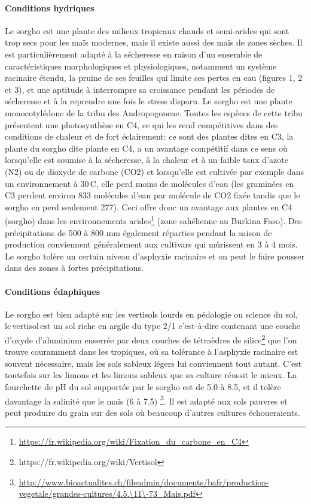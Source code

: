 \documentclass[a4paper,11pt]{article}
\begin{document}
\paragraph{Conditions hydriques} Le sorgho est une plante des milieux
tropicaux chauds et semi-arides qui sont trop secs pour les maïs
modernes, mais il existe aussi des maïs de zones sèches. Il est
particulièrement adapté à la sécheresse en raison d’un ensemble de
caractéristiques morphologiques et physiologiques, notamment un
système racinaire étendu, la pruine de ses feuilles qui limite ses
pertes en eau (figures 1, 2 et 3), et une aptitude à interrompre sa
croissance pendant les périodes de sécheresse et à la reprendre une
fois le stress disparu. Le sorgho est une plante monocotylédone de la
tribu des Andropogoneae. Toutes les espèces de cette tribu présentent
une photosynthèse en C4, ce qui les rend compétitives dans des
conditions de chaleur et de fort éclairement: ce sont des plantes
dites en C3, la plante du sorgho dite plante en C4, a un avantage
compétitif dans ce sens où\,lorsqu’elle est soumise à la sécheresse, à
la chaleur et à un faible taux d’azote (N2) ou de dioxyde de carbone
(CO2) et lorsqu’elle est cultivée par exemple dans un environnement à
30\,\degree{}C, elle perd moins de molécules d’eau (les graminées en
C3 perdent environ 833 molécules d’eau par molécule de CO2 fixée
tandis que le sorgho en perd seulement 277). Ceci offre donc un
avantage aux plantes en C4 (sorgho) dans les environnements
arides\footnote{\url{https://fr.wikipedia.org/wiki/Fixation_du_carbone_en_C4}}
(zone sahélienne au Burkina Faso). Des précipitations de 500 à 800 mm
également réparties pendant la saison de production conviennent
généralement aux cultivars qui mûrissent en 3 à 4 mois. Le sorgho
tolère un certain niveau d’asphyxie racinaire et on peut le faire
pousser dans des zones à fortes précipitations\cite{BARRO_KONDOMBO_2010}.

 
\paragraph{Conditions édaphiques}
Le sorgho est bien adapté sur les vertisols lourds en pédologie ou
science du sol, le\,vertisol\,est un sol riche en argile du type 2/1
c’est-à-dire contenant une couche d’oxyde d’aluminium enserrée par deux couches de tétraèdres de
silice\footnote{https://fr.wikipedia.org/wiki/Vertisol} que l’on
trouve couramment dans les tropiques, où sa tolérance à l’asphyxie
racinaire est souvent nécessaire, mais les sols sableux légers lui
conviennent tout autant. C’est toutefois sur les limons et les limons
sableux que sa culture réussit le mieux. La fourchette de pH du sol
supportée par le sorgho est de 5.0 à 8.5, et il tolère davantage la
salinité que le maïs (6 à 7.5)
\footnote{\url{http://www.bioactualites.ch/fileadmin/documents/bafr/production-vegetale/grandes-cultures/4.5.\11\-73_Mais.pdf}}. Il est adapté aux sols pauvres et peut produire du grain sur des sols où beaucoup d’autres cultures échoueraients\cite{BARRO_KONDOMBO_2010}.
 
\end{document}
